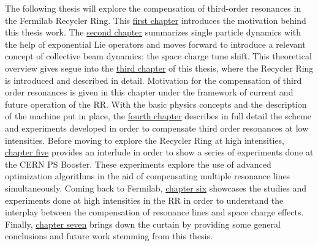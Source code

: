 The following thesis will explore the compensation of third-order resonances in the Fermilab Recycler Ring. This \hyperref[sec:ch1]{first chapter} introduces the motivation behind this thesis work. The \hyperref[sec:ch2]{second chapter} summarizes single particle dynamics with the help of exponential Lie operators and moves forward to introduce a relevant concept of collective beam dynamics: the space charge tune shift. This theoretical overview gives segue into the \hyperref[sec:ch3]{third chapter} of this thesis, where the Recycler Ring is introduced and described in detail. Motivation for the compensation of third order resonances is given in this chapter under the framework of current and future operation of the RR. With the basic physics concepts and the description of the machine put in place, the \hyperref[sec:ch4]{fourth chapter} describes in full detail the scheme and experiments developed in order to compensate third order resonances at low intensities. Before moving to explore the Recycler Ring at high intensities, \hyperref[sec:ch5]{chapter five} provides an interlude in order to show a series of experiments done at the CERN PS Booster. These experiments explore the use of advanced optimization algorithms in the aid of compensating multiple resonance lines simultaneously. Coming back to Fermilab, \hyperref[sec:ch6]{chapter six} showcases the studies and experiments done at high intensities in the RR in order to understand the interplay between the compensation of resonance lines and space charge effects. Finally, \hyperref[sec:ch7]{chapter seven} brings down the curtain by providing some general conclusions and future work stemming from this thesis.